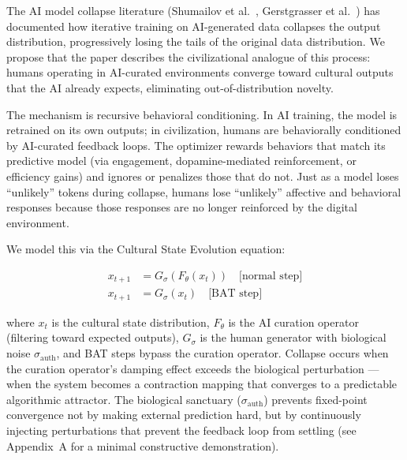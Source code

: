 \documentclass[11pt, a4paper]{article}
\theoremstyle{remark}
\begin{document}
The AI model collapse literature (Shumailov et al.~\cite{shumailov2024}, Gerstgrasser et al.~\cite{gerstgrasser2024}) has documented how iterative training on AI-generated data collapses the output distribution, progressively losing the tails of the original data distribution. We propose that the paper describes the civilizational analogue of this process: humans operating in AI-curated environments converge toward cultural outputs that the AI already expects, eliminating out-of-distribution novelty.

The mechanism is recursive behavioral conditioning. In AI training, the model is retrained on its own outputs; in civilization, humans are behaviorally conditioned by AI-curated feedback loops. The optimizer rewards behaviors that match its predictive model (via engagement, dopamine-mediated reinforcement, or efficiency gains) and ignores or penalizes those that do not. Just as a model loses ``unlikely'' tokens during collapse, humans lose ``unlikely'' affective and behavioral responses because those responses are no longer reinforced by the digital environment.

We model this via the Cultural State Evolution equation:

\begin{align}
x_{t+1} &= G_\sigma(F_\theta(x_t)) \quad \text{[normal step]} \label{eq:cse-normal} \\
x_{t+1} &= G_\sigma(x_t) \quad \text{[BAT step]} \label{eq:cse-bat}
\end{align}

where $x_t$ is the cultural state distribution, $F_\theta$ is the AI curation operator (filtering toward expected outputs), $G_\sigma$ is the human generator with biological noise $\sigma_{\text{auth}}$, and BAT steps bypass the curation operator. Collapse occurs when the curation operator's damping effect exceeds the biological perturbation --- when the system becomes a contraction mapping that converges to a predictable algorithmic attractor. The biological sanctuary ($\sigma_{\text{auth}}$) prevents fixed-point convergence not by making external prediction hard, but by continuously injecting perturbations that prevent the feedback loop from settling (see Appendix~A for a minimal constructive demonstration).
\end{document}

